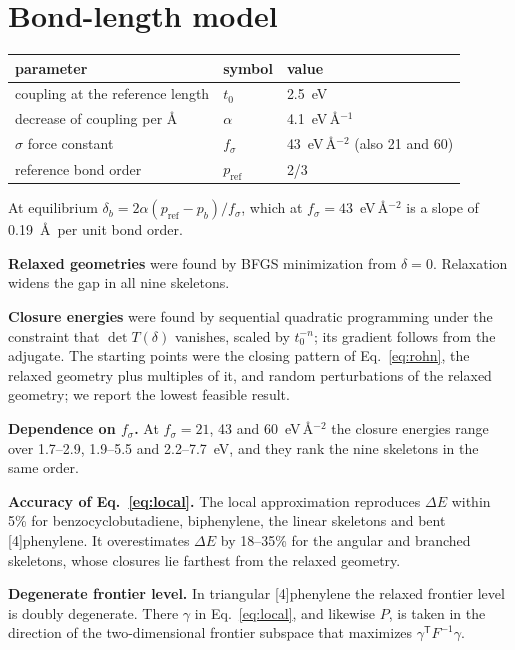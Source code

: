\documentclass[11pt]{article}
\newcommand{\T}{\mathsf{T}}
\begin{document}
\appendix
\section{Bond-length model}
\label{app:model}

\begin{center}
\small
\begin{tabular}{lll}
\toprule
parameter & symbol & value \\
\midrule
coupling at the reference length & $t_0$ & 2.5~eV \\
decrease of coupling per \AA & $\alpha$ & 4.1~eV\,\AA$^{-1}$ \\
$\sigma$ force constant & $f_\sigma$ & 43~eV\,\AA$^{-2}$ (also 21 and 60) \\
reference bond order & $p_{\text{ref}}$ & 2/3 \\
\bottomrule
\end{tabular}
\end{center}

At equilibrium $\delta_b=2\alpha(p_{\text{ref}}-p_b)/f_\sigma$, which at $f_\sigma=43$~eV\,\AA$^{-2}$ is a slope of 0.19~\AA\ per unit bond order.

\textbf{Relaxed geometries} were found by BFGS minimization from $\delta=0$. Relaxation widens the gap in all nine skeletons.

\textbf{Closure energies} were found by sequential quadratic programming under the constraint that $\det T(\delta)$ vanishes, scaled by $t_0^{-n}$; its gradient follows from the adjugate. The starting points were the closing pattern of Eq.~\eqref{eq:rohn}, the relaxed geometry plus multiples of it, and random perturbations of the relaxed geometry; we report the lowest feasible result.

\textbf{Dependence on $f_\sigma$.} At $f_\sigma=21$, 43 and 60~eV\,\AA$^{-2}$ the closure energies range over 1.7--2.9, 1.9--5.5 and 2.2--7.7~eV, and they rank the nine skeletons in the same order.

\textbf{Accuracy of Eq.~\eqref{eq:local}.} The local approximation reproduces $\Delta E$ within 5\% for benzocyclobutadiene, biphenylene, the linear skeletons and bent [4]phenylene. It overestimates $\Delta E$ by 18--35\% for the angular and branched skeletons, whose closures lie farthest from the relaxed geometry.

\textbf{Degenerate frontier level.} In triangular [4]phenylene the relaxed frontier level is doubly degenerate. There $\gamma$ in Eq.~\eqref{eq:local}, and likewise $P$, is taken in the direction of the two-dimensional frontier subspace that maximizes $\gamma^\T F^{-1}\gamma$.
\end{document}
